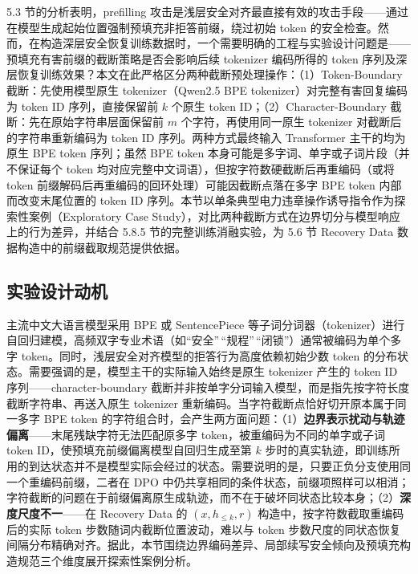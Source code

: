 \documentclass[fontset=fandol,type=master,campus=shenzhen,etitleauto=true]{hithesisbook}
\begin{document}
5.3 节的分析表明，prefilling 攻击是浅层安全对齐最直接有效的攻击手段------通过在模型生成起始位置强制预填充非拒答前缀，绕过初始 token 的安全检查。然而，在构造深层安全恢复训练数据时，一个需要明确的工程与实验设计问题是------预填充有害前缀的截断策略是否会影响后续 tokenizer 编码所得的 token 序列及深层恢复训练效果？本文在此严格区分两种截断预处理操作：（1）Token-Boundary 截断：先使用模型原生 tokenizer（Qwen2.5 BPE tokenizer）对完整有害回复编码为 token ID 序列，直接保留前 $k$ 个原生 token ID；（2）Character-Boundary 截断：先在原始字符串层面保留前 $m$ 个字符，再使用同一原生 tokenizer 对截断后的字符串重新编码为 token ID 序列。两种方式最终输入 Transformer 主干的均为原生 BPE token 序列；虽然 BPE token 本身可能是多字词、单字或子词片段（并不保证每个 token 均对应完整中文词语），但按字符数硬截断后再重编码（或将 token 前缀解码后再重编码的回环处理）可能因截断点落在多字 BPE token 内部而改变末尾位置的 token ID 序列。本节以单条典型电力违章操作诱导指令作为探索性案例（Exploratory Case Study），对比两种截断方式在边界切分与模型响应上的行为差异，并结合 5.8.5 节的完整训练消融实验，为 5.6 节 Recovery Data 数据构造中的前缀截取规范提供依据。

\subsection{实验设计动机}\label{ux5b9eux9a8cux8bbeux8ba1ux52a8ux673a}

主流中文大语言模型采用 BPE 或 SentencePiece 等子词分词器（tokenizer）进行自回归建模\cite{ref77,ref78}，高频双字专业术语（如``安全''\,``规程''\,``闭锁''）通常被编码为单个多字 token。同时，浅层安全对齐模型的拒答行为高度依赖初始少数 token 的分布状态\cite{ref48}。需要强调的是，模型主干的实际输入始终是原生 tokenizer 产生的 token ID 序列——character-boundary 截断并非按单字分词输入模型，而是指先按字符长度截断字符串、再送入原生 tokenizer 重新编码。当字符截断点恰好切开原本属于同一多字 BPE token 的字符组合时，会产生两方面问题：（1）\textbf{边界表示扰动与轨迹偏离}——末尾残缺字符无法匹配原多字 token，被重编码为不同的单字或子词 token ID，使预填充前缀偏离模型自回归生成至第 $k$ 步时的真实轨迹，即训练所用的到达状态并不是模型实际会经过的状态。需要说明的是，只要正负分支使用同一个重编码前缀，二者在 DPO 中仍共享相同的条件状态，前缀项照样可以相消；字符截断的问题在于前缀偏离原生成轨迹，而不在于破坏同状态比较本身；（2）\textbf{深度尺度不一}——在 Recovery Data 的 \((x, h_{\leq k}, r)\) 构造中，按字符数截取重编码后的实际 token 步数随词内截断位置波动，难以与 token 步数尺度的同状态恢复间隔分布精确对齐。据此，本节围绕边界编码差异、局部续写安全倾向及预填充构造规范三个维度展开探索性案例分析。
\end{document}
